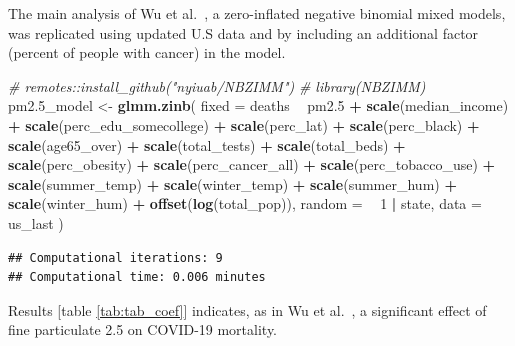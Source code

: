 \documentclass[12pt,halfline,a4paper,]{ouparticle}
\newenvironment{Shaded}{\begin{snugshade}}{\end{snugshade}}
\newcommand{\CommentTok}[1]{\textcolor[rgb]{0.56,0.35,0.01}{\textit{#1}}}
\newcommand{\DataTypeTok}[1]{\textcolor[rgb]{0.13,0.29,0.53}{#1}}
\newcommand{\DecValTok}[1]{\textcolor[rgb]{0.00,0.00,0.81}{#1}}
\newcommand{\FloatTok}[1]{\textcolor[rgb]{0.00,0.00,0.81}{#1}}
\newcommand{\KeywordTok}[1]{\textcolor[rgb]{0.13,0.29,0.53}{\textbf{#1}}}
\newcommand{\NormalTok}[1]{#1}
\newcommand{\OperatorTok}[1]{\textcolor[rgb]{0.81,0.36,0.00}{\textbf{#1}}}
\newcommand{\StringTok}[1]{\textcolor[rgb]{0.31,0.60,0.02}{#1}}
\begin{document}
The main analysis of Wu et al.~\citeyearpar{wu2020m}, a zero-inflated
negative binomial mixed models, was replicated using updated U.S data
and by including an additional factor (percent of people with cancer) in
the model.

\begin{Shaded}
\begin{Highlighting}[]
\CommentTok{# remotes::install_github("nyiuab/NBZIMM")}
\CommentTok{# library(NBZIMM)}
\NormalTok{pm2}\FloatTok{.5}\NormalTok{_model <-}\StringTok{ }\KeywordTok{glmm.zinb}\NormalTok{(}
  \DataTypeTok{fixed =}
\NormalTok{    deaths }\OperatorTok{~}
\StringTok{    }\NormalTok{pm2}\FloatTok{.5} \OperatorTok{+}
\StringTok{      }\KeywordTok{scale}\NormalTok{(median_income) }\OperatorTok{+}
\StringTok{      }\KeywordTok{scale}\NormalTok{(perc_edu_somecollege) }\OperatorTok{+}
\StringTok{      }\KeywordTok{scale}\NormalTok{(perc_lat) }\OperatorTok{+}
\StringTok{      }\KeywordTok{scale}\NormalTok{(perc_black) }\OperatorTok{+}
\StringTok{      }\KeywordTok{scale}\NormalTok{(age65_over) }\OperatorTok{+}
\StringTok{      }\KeywordTok{scale}\NormalTok{(total_tests) }\OperatorTok{+}
\StringTok{      }\KeywordTok{scale}\NormalTok{(total_beds) }\OperatorTok{+}
\StringTok{      }\KeywordTok{scale}\NormalTok{(perc_obesity) }\OperatorTok{+}
\StringTok{      }\KeywordTok{scale}\NormalTok{(perc_cancer_all) }\OperatorTok{+}
\StringTok{      }\KeywordTok{scale}\NormalTok{(perc_tobacco_use) }\OperatorTok{+}
\StringTok{      }\KeywordTok{scale}\NormalTok{(summer_temp) }\OperatorTok{+}
\StringTok{      }\KeywordTok{scale}\NormalTok{(winter_temp) }\OperatorTok{+}
\StringTok{      }\KeywordTok{scale}\NormalTok{(summer_hum) }\OperatorTok{+}
\StringTok{      }\KeywordTok{scale}\NormalTok{(winter_hum) }\OperatorTok{+}
\StringTok{      }\KeywordTok{offset}\NormalTok{(}\KeywordTok{log}\NormalTok{(total_pop)),}
  \DataTypeTok{random =} \OperatorTok{~}\StringTok{ }\DecValTok{1} \OperatorTok{|}\StringTok{ }\NormalTok{state,}
  \DataTypeTok{data =}\NormalTok{ us_last}
\NormalTok{)}
\end{Highlighting}
\end{Shaded}

\begin{verbatim}
## Computational iterations: 9 
## Computational time: 0.006 minutes
\end{verbatim}

Results {[}table \ref{tab:tab_coef}{]} indicates, as in Wu et
al.~\citeyearpar{wu2020m}, a significant effect of fine particulate 2.5
on COVID-19 mortality.
\end{document}
